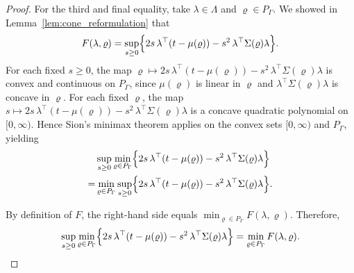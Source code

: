\documentclass[12pt,leqno,titlepage]{amsart}
\newcommand{\1}{\mathbbm{1}}
\begin{document}
\begin{bibunit}
\begin{proof}
For the third and final equality, take $\lambda \in \Lambda$ and $\varrho \in P_\Gamma$. We showed in Lemma~\ref{lem:cone_reformulation}
that
\[
F(\lambda,\varrho)
=
\sup_{s\ge 0}
\Bigl\{
2s\,\lambda^\top(t-\mu(\varrho))
-
s^2\,\lambda^\top\Sigma(\varrho)\lambda
\Bigr\}.
\]
For each fixed $s\ge0$, the map $\varrho \mapsto 2s\,\lambda^\top(t-\mu(\varrho))
-
s^2\,\lambda^\top\Sigma(\varrho)\lambda$ is convex and continuous on $P_\Gamma$, since $\mu(\varrho)$ is linear in $\varrho$ and
$\lambda^\top\Sigma(\varrho)\lambda$ is concave in $\varrho$.
For each fixed $\varrho$, the map $s\mapsto 2s\,\lambda^\top(t-\mu(\varrho))
-
s^2\,\lambda^\top\Sigma(\varrho)\lambda$ is a concave
quadratic polynomial on $[0,\infty)$.
Hence Sion's minimax theorem applies on the convex sets
$[0,\infty)$ and $P_\Gamma$, yielding
\begin{align*}
&\sup_{s\ge0}
\min_{\varrho\in P_\Gamma}
\Bigl\{2s\,\lambda^\top(t-\mu(\varrho))
-
s^2\,\lambda^\top\Sigma(\varrho)\lambda\Bigr\}\\
=
&\min_{\varrho\in P_\Gamma}
\sup_{s\ge0}
\Bigl\{2s\,\lambda^\top(t-\mu(\varrho))
-
s^2\,\lambda^\top\Sigma(\varrho)\lambda\Bigr\}.
\end{align*}

By definition of $F$, the right-hand side equals
$\min_{\varrho\in P_\Gamma} F(\lambda,\varrho)$.
Therefore,
\[
\sup_{s\ge0}
\min_{\varrho\in P_\Gamma}
\Bigl\{
2s\,\lambda^\top(t-\mu(\varrho))
-
s^2\,\lambda^\top\Sigma(\varrho)\lambda
\Bigr\}
=
\min_{\varrho\in P_\Gamma}
F(\lambda,\varrho).
\]


\end{proof}
\end{bibunit}
\end{document}
